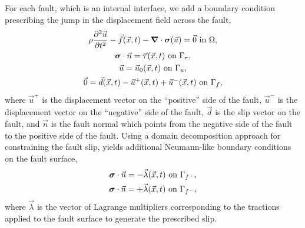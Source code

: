 For each fault, which is an internal interface, we add a boundary
condition prescribing the jump in the displacement field across the
fault,
\begin{gather}
  \rho \frac{\partial^2\vec{u}}{\partial t^2} - \vec{f}(\vec{x},t) - \tensor{\nabla} \cdot 
\tensor{\sigma}
(\vec{u}) = \vec{0} \text{ in }\Omega, \\
%
  \tensor{\sigma} \cdot \vec{n} = \vec{\tau}(\vec{x},t) \text{ on
  }\Gamma_{\tau}, \\
%
  \vec{u} = \vec{u}_0(\vec{x},t) \text{ on }\Gamma_u, \\
%
  \label{eqn:bc:prescribed_slip}
  \vec{0} = \vec{d}(\vec{x},t) - \vec{u}^+(\vec{x},t) + \vec{u}^-(\vec{x},t) \text{ on }\Gamma_f,
\end{gather}
where $\vec{u}^+$ is the displacement vector on the ``positive'' side
of the fault, $\vec{u}^-$ is the displacement vector on the ``negative''
side of the fault, $\vec{d}$ is the slip vector on the fault, and
$\vec{n}$ is the fault normal which points from the negative side of
the fault to the positive side of the fault. Using a domain
decomposition approach for constraining the fault slip, yields
additional Neumann-like boundary conditions on the fault surface,
\begin{gather}
  \bm{\sigma} \cdot \vec{n} = -\vec{\lambda}(\vec{x},t) \text{ on }\Gamma_{f^+}, \\
  \bm{\sigma} \cdot \vec{n} = +\vec{\lambda}(\vec{x},t) \text{ on }\Gamma_{f^-},
\end{gather}
where $\vec{\lambda}$ is the vector of Lagrange multipliers
corresponding to the tractions applied to the fault surface to
generate the prescribed slip.

